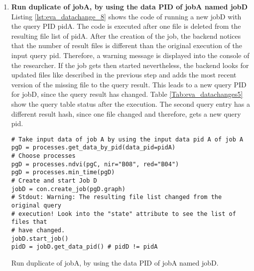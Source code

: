 \documentclass[draft,final]{vutinfth} %
\newenvironment{code}{\captionsetup{type=listing}}{}
\begin{document}
\begin{enumerate}
	\begin{code}
		\begin{verbatim} 
[{'timestamp': '2019-03-31 17:44:43', 
'path': '/eodc/products/copernicus.eu/s2a_prd_msil1c/2017/05/24/
S2A_MSIL1C_20170524T101031_N0205_R022_T32TQR_20170524T101353_new.zip'}]
		\end{verbatim}
		\caption{List of files that replaced original files of the query result.}
		\label{lst:eva_datachange_state}
	\end{code}
	
	\item \textbf{Run duplicate of jobA, by using the data PID of jobA named jobD}\\
	Listing \ref{lst:eva_datachange_8} shows the code of running a new jobD with the query PID pidA. The code is executed after one file is deleted from the resulting file list of pidA. After the creation of the job, the backend notices that the number of result files is different than the original execution of the input query pid. Therefore, a warning message is displayed into the console of the researcher. If the job gets then started nevertheless, the backend looks for updated files like described in the previous step and adds the most recent version of the missing file to the query result. This leads to a new query PID for jobD, since the query result has changed. Table \ref{Tab:eva_datachanges5} show the query table status after the execution. The second query entry has a different result hash, since one file changed and therefore, gets a new query pid.  
	\begin{code}
		\begin{verbatim}
# Take input data of job A by using the input data pid A of job A
pgD = processes.get_data_by_pid(data_pid=pidA)
# Choose processes
pgD = processes.ndvi(pgC, nir="B08", red="B04")
pgD = processes.min_time(pgD)
# Create and start Job D
jobD = con.create_job(pgD.graph)
# Stdout: Warning: The resulting file list changed from the original query
# execution! Look into the "state" attribute to see the list of files that
# have changed. 
jobD.start_job()
pidD = jobD.get_data_pid() # pidD != pidA
		\end{verbatim}
		\caption{Run duplicate of jobA, by using the data PID of jobA named jobD.}
		\label{lst:eva_datachange_8}
	\end{code}
	

\end{enumerate}
\end{document}
